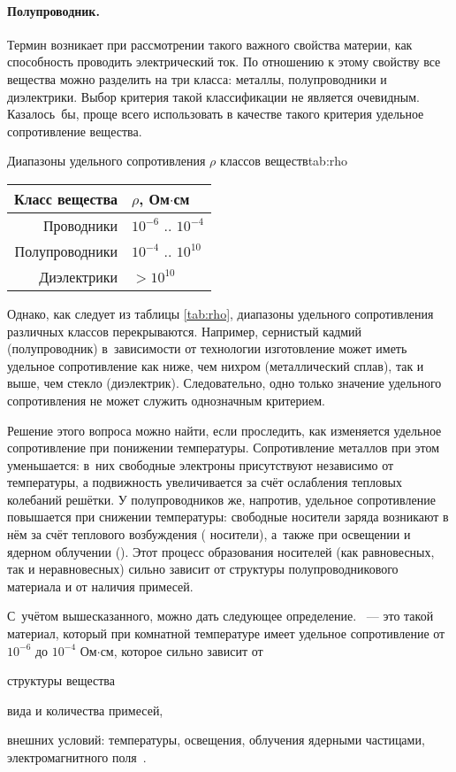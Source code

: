 \documentclass[a4paper, 14pt, titlepage]{extarticle}
\begin{document}
  \paragraph{Полупроводник.} Термин  возникает при рассмотрении такого важного
  свойства материи, как способность проводить электрический ток. По отношению к этому свойству все
  вещества можно разделить на три класса: металлы, полупроводники и диэлектрики. Выбор критерия
  такой классификации не является очевидным. Казалось~бы, проще всего использовать в качестве такого
  критерия удельное сопротивление вещества.

  \begin{mytable}{Диапазоны удельного сопротивления $\rho$ классов веществ}{tab:rho}
    \begin{tabular}{r|l}
      Класс вещества & $\rho$, Ом$\cdot$см \\
      \hline
      Проводники     & $10^{-6}$ .. $10^{-4}$\\
      Полупроводники & $10^{-4}$ .. $10^{10}$\\
      Диэлектрики    & $> 10^{10}$\\
    \end{tabular}
  \end{mytable}

  Однако, как следует из таблицы \ref{tab:rho}, диапазоны удельного сопротивления различных классов
  перекрываются. Например, сернистый кадмий (полупроводник) в~зависимости от технологии изготовление
  может иметь удельное сопротивление как ниже, чем нихром (металлический сплав), так и выше, чем
  стекло (диэлектрик). Следовательно, одно только значение удельного сопротивления не может служить
  однозначным критерием.

  Решение этого вопроса можно найти, если проследить, как изменяется удельное сопротивление при
  понижении температуры. Сопротивление металлов при этом уменьшается: в~них свободные электроны
  присутствуют независимо от температуры, а подвижность увеличивается за счёт ослабления тепловых
  колебаний решётки. У полупроводников же, напротив, удельное сопротивление повышается при снижении
  температуры: свободные носители заряда возникают в нём за счёт теплового возбуждения
  ( носители), а~также при освещении и ядерном облучении ().
  Этот процесс образования носителей (как равновесных, так и неравновесных) сильно зависит от
  структуры полупроводникового материала и от наличия примесей.

  С~учётом вышесказанного, можно дать следующее определение. ~--- это такой
  материал, который при комнатной температуре имеет удельное сопротивление от $10^{-6}$ до $10^{-4}$
  Ом$\cdot$см, которое сильно зависит от
  \begin{enumerate*}[label=\asbuk*)]
    \item структуры вещества
    \item вида и количества примесей,
    \item внешних условий: температуры, освещения, облучения ядерными частицами, электромагнитного
      поля~\cite{shalimova-semiconductors}.
  \end{enumerate*}
\end{document}
